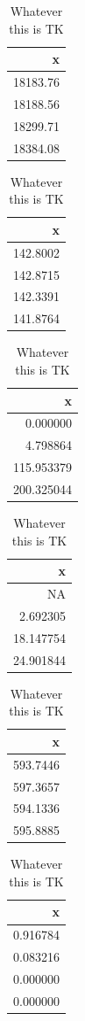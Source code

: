 \documentclass[
  english,
  ,jou,floatsintext]{apa6}
\begin{document}
\begin{table}
\caption{\label{tab:h2waics}Whatever this is TK}

\centering
\begin{tabular}[t]{r}
\hline
x\\
\hline
18183.76\\
\hline
18188.56\\
\hline
18299.71\\
\hline
18384.08\\
\hline
\end{tabular}
\centering
\begin{tabular}[t]{r}
\hline
x\\
\hline
142.8002\\
\hline
142.8715\\
\hline
142.3391\\
\hline
141.8764\\
\hline
\end{tabular}
\centering
\begin{tabular}[t]{r}
\hline
x\\
\hline
0.000000\\
\hline
4.798864\\
\hline
115.953379\\
\hline
200.325044\\
\hline
\end{tabular}
\centering
\begin{tabular}[t]{r}
\hline
x\\
\hline
NA\\
\hline
2.692305\\
\hline
18.147754\\
\hline
24.901844\\
\hline
\end{tabular}
\centering
\begin{tabular}[t]{r}
\hline
x\\
\hline
593.7446\\
\hline
597.3657\\
\hline
594.1336\\
\hline
595.8885\\
\hline
\end{tabular}
\centering
\begin{tabular}[t]{r}
\hline
x\\
\hline
0.916784\\
\hline
0.083216\\
\hline
0.000000\\
\hline
0.000000\\
\hline
\end{tabular}
\end{table}
\end{document}
